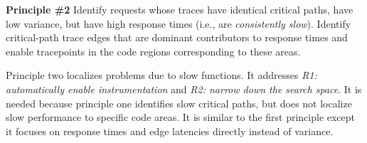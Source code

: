 
% 

% 

% 

%


\noindent\textbf{Principle \#2} Identify requests whose traces have
identical critical paths, have low variance, but have high response
times (i.e., are \textit{consistently slow}).  Identify critical-path
trace edges that are dominant contributors to response times and
enable tracepoints in the code regions corresponding to
these areas.

Principle two localizes problems due to slow functions. It addresses
\textit{R1: automatically enable instrumentation} and \textit{R2:
  narrow down the search space}.  It is needed because principle one
identifies slow critical paths, but does not localize slow performance
to specific code areas.  It is similar to the first principle except
it focuses on response times and edge latencies directly instead of
variance.

